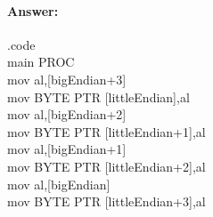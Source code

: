 \documentclass[12pt]{article}
\begin{document}
\paragraph{Answer: } 
	.code \\ 
	main PROC \\
	mov al,[bigEndian+3] \\
	mov BYTE PTR [littleEndian],al \\
	mov al,[bigEndian+2] \\
	mov BYTE PTR [littleEndian+1],al \\
	mov al,[bigEndian+1] \\
	mov BYTE PTR [littleEndian+2],al \\
	mov al,[bigEndian] \\
	mov BYTE PTR [littleEndian+3],al \\
\end{document}
